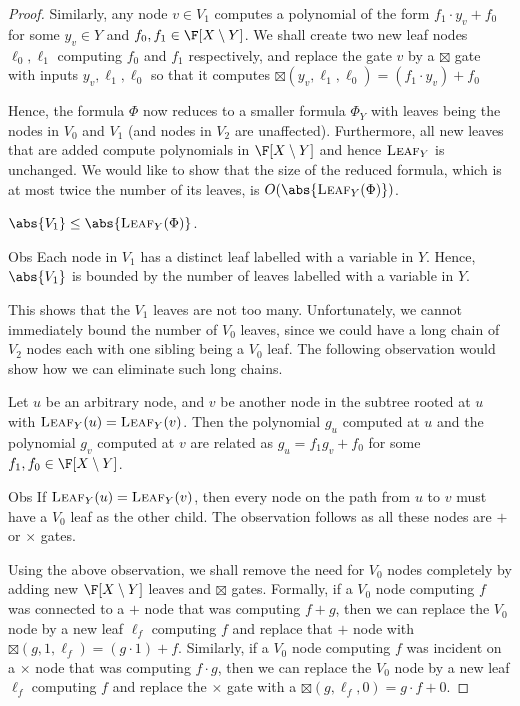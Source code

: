 \begin{proof}
  Similarly, any node $v\in V_1$ computes a polynomial of the form $f_1 \cdot y_v + f_0$ for some $y_v\in Y$
  and $f_0,f_1 \in \F[X\setminus Y]$. 
  We shall create two new leaf nodes $\ell_0,\ell_1$ computing $f_0$ and $f_1$ respectively, and replace the gate $v$ by a $\boxtimes$ gate with inputs $y_v,\ell_1,\ell_0$ so that it computes $\boxtimes(y_v,\ell_1,\ell_0) = (f_1 \cdot y_v) + f_0$

  Hence, the formula $\Phi$ now reduces to a smaller formula $\Phi_Y$ with
  leaves  being the nodes in $V_0$ and $V_1$ (and nodes in $V_2$ are
  unaffected). 
  Furthermore, all new leaves that are added compute polynomials in $\F[X \setminus Y]$ and hence $\textsc{Leaf}_Y$ is unchanged. 
We would like to show that the size of the reduced
  formula, which is at most twice the number of its leaves, is
  $O(\abs{\textsc{Leaf}_Y(\Phi)})$.

  \begin{observation}\label{obs:v1-bound}$\abs{V_1} \leq \abs{\textsc{Leaf}_Y(\Phi)}$.    
  \end{observation}
  \begin{myproof}{Obs}
    Each node in $V_1$ has a distinct leaf labelled with a variable in $Y$.
Hence, $\abs{V_1}$ is bounded by the number of leaves labelled with a variable in $Y$.
  \end{myproof}
  
  This shows that the $V_1$ leaves are not too many.
Unfortunately, we cannot immediately bound the number of $V_0$ leaves, since we could have a long chain of $V_2$ nodes each with one sibling being a $V_0$ leaf.
The following observation would show how we can eliminate such long chains.

  \begin{observation}\label{obs:same-leaf-collapse}
    Let $u$ be an arbitrary node, and $v$ be another node in the subtree rooted at $u$ with $\textsc{Leaf}_Y(u) = \textsc{Leaf}_Y(v)$.
Then the polynomial $g_u$ computed at $u$ and the polynomial $g_v$ computed at $v$ are related as $g_u = f_1 g_v + f_0$ for some $f_1,f_0 \in \F[X\setminus Y]$.
  \end{observation}
  \begin{myproof}{Obs}
    If $\textsc{Leaf}_Y(u) =\textsc{Leaf}_Y(v)$, then every node on
    the path from $u$ to $v$ must have a $V_0$ leaf as the other child. 
The
    observation follows as all these nodes are $+$ or $\times$ gates.
  \end{myproof}

  Using the above observation, we shall remove the need for $V_0$
  nodes completely by adding new $\F[X\setminus Y]$ leaves and $\boxtimes$ gates. 
  Formally, if a $V_0$ node computing $f$ was connected to a $+$ node that was computing $f + g$, then we can replace the $V_0$ node by a new leaf $\ell_f$ computing $f$ and replace that $+$ node with $\boxtimes(g,1,\ell_f) = (g \cdot 1) + f$. Similarly, if a $V_0$ node computing $f$ was incident on a $\times$ node that was computing $f \cdot g$, then we can replace the $V_0$ node by a new leaf $\ell_f$ computing $f$ and replace the $\times$ gate with a $\boxtimes(g,\ell_f,0) = g \cdot f + 0$. 


\end{proof}
